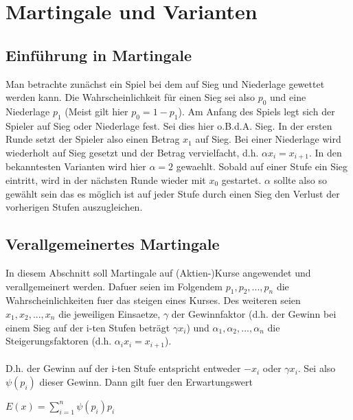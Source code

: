 \documentclass[11pt]{scrartcl}
\begin{document}
	\section{Martingale und Varianten}
		\subsection{Einführung in Martingale}
			Man betrachte zunächst ein Spiel bei dem auf Sieg und Niederlage gewettet werden kann. Die Wahrscheinlichkeit für einen Sieg sei also \(p_{0}\) und eine Niederlage \(p_{1}\) (Meist gilt hier \(p_{0} = 1-p_{1}\)). Am Anfang des Spiels legt sich der Spieler auf Sieg oder Niederlage fest. Sei dies hier o.B.d.A. Sieg. In der ersten Runde setzt der Spieler also einen Betrag \(x_{1}\)  auf Sieg. Bei einer Niederlage wird wiederholt auf Sieg gesetzt und der Betrag vervielfacht, d.h. \(\alpha x_{i} = x_{i+1}\). In den bekanntesten Varianten wird hier \(\alpha = 2\) gewaehlt. Sobald auf einer Stufe ein Sieg eintritt, wird in der nächsten Runde wieder mit \(x_{0}\) gestartet. \(\alpha\) sollte also so gewählt sein das es möglich ist auf jeder Stufe durch einen Sieg den Verlust der vorherigen Stufen auszugleichen.
		\subsection{Verallgemeinertes Martingale}
			In diesem Abschnitt soll Martingale auf (Aktien-)Kurse angewendet und verallgemeinert werden. Dafuer seien im Folgendem \(p_{1}, p_{2}, ...,p_{n}\) die Wahrscheinlichkeiten fuer das steigen eines Kurses. Des weiteren seien \(x_{1}, x_{2}, ...,x_{n}\) die jeweiligen Einsaetze, \(\gamma\) der Gewinnfaktor (d.h. der Gewinn bei einem Sieg auf der i-ten Stufen beträgt \(\gamma x_{i}\)) und \(\alpha_{1}, \alpha_{2}, ...,\alpha_{n}\) die Steigerungsfaktoren (d.h. \(\alpha_{i}x_{i}=x_{i+1}\)).\\\\
			D.h. der Gewinn auf der i-ten Stufe entspricht entweder \(-x_{i}\) oder \(\gamma x_{i}\). Sei also \(\psi(p_{i})\) dieser Gewinn. Dann gilt fuer den Erwartungswert
			\begin{center}
			\(E(x)=\sum_{i=1}^n \psi(p_{i})p_{i}\)
			\end{center}
\end{document}
